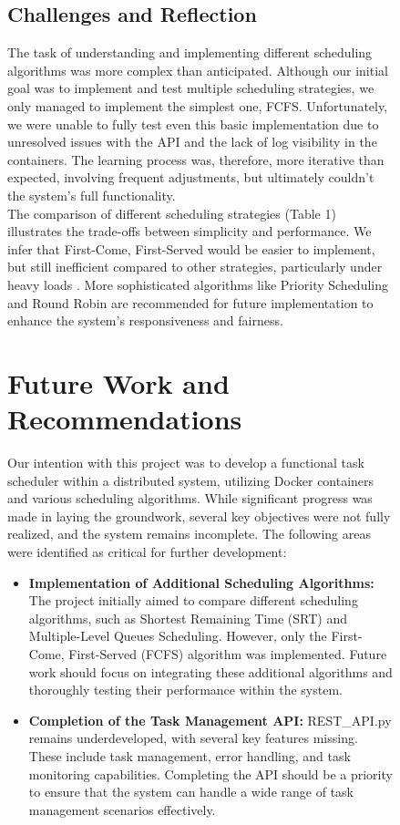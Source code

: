 \documentclass{article}
\begin{document}
\begin{figure}[h!]
\subsection{Challenges and Reflection}
The task of understanding and implementing different scheduling algorithms was more complex than anticipated. Although our initial goal was to implement and test multiple scheduling strategies, we only managed to implement the simplest one, FCFS. Unfortunately, we were unable to fully test even this basic implementation due to unresolved issues with the API and the lack of log visibility in the containers. The learning process was, therefore, more iterative than expected, involving frequent adjustments, but ultimately couldn't the system’s full functionality. \\

The comparison of different scheduling strategies (Table 1) illustrates the trade-offs between simplicity and performance. We infer that First-Come, First-Served would be easier to implement, but still inefficient compared to other strategies, particularly under heavy loads \cite{Tyagi & Gupta, 2018}. More sophisticated algorithms like Priority Scheduling and Round Robin are recommended for future implementation to enhance the system's responsiveness and fairness.

\section{Future Work and Recommendations}

Our intention with this project was to develop a functional task scheduler within a distributed system, utilizing Docker containers and various scheduling algorithms. While significant progress was made in laying the groundwork, several key objectives were not fully realized, and the system remains incomplete. The following areas were identified as critical for further development:

\begin{itemize}
\item \textbf{Implementation of Additional Scheduling Algorithms:} The project initially aimed to compare different scheduling algorithms, such as Shortest Remaining Time (SRT) and Multiple-Level Queues Scheduling. However, only the First-Come, First-Served (FCFS) algorithm was implemented. Future work should focus on integrating these additional algorithms and thoroughly testing their performance within the system.

\item \textbf{Completion of the Task Management API:}  REST\_API.py remains underdeveloped, with several key features missing. These include task management, error handling, and task monitoring capabilities. Completing the API should be a priority to ensure that the system can handle a wide range of task management scenarios effectively.


\end{itemize}
\end{figure}
\end{document}

